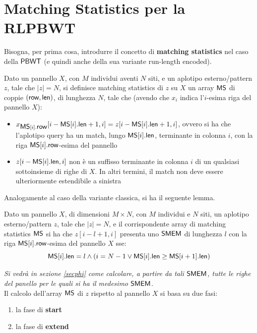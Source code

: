 \section{Matching Statistics per la RLPBWT}
Bisogna, per prima cosa, introdurre il 
concetto di \textbf{matching statistics} nel caso della $\mbox{\rm {\sf PBWT}}$ (e quindi
anche della sua variante run-length encoded).
\begin{definizione}
  Dato un pannello $X$, con $M$ individui aventi $N$ siti,
  e un aplotipo esterno/pattern $z$, tale che $|z|=N$, si definisce matching
  statistics di $z$ su $X$ un array $\mbox{\rm {\sf MS}}$ di coppie $(\mbox{\rm {\sf row}},\mbox{\rm {\sf len}})$, di lunghezza
  $N$, tale che (avendo che $x_i$ indica l'$i$-esima riga del pannello $X$): 
  \begin{itemize}
    \item $x_{\mbox{\rm {\sf MS}}[i].\mbox{\rm {\sf row}}}[i-\mbox{\rm {\sf MS}}[i].\mbox{\rm {\sf len}}+1,i]=z[i-\mbox{\rm {\sf MS}}[i].\mbox{\rm {\sf len}}+1,i]$, ovvero si
    ha che 
    l'aplotipo query ha un match, lungo $\mbox{\rm {\sf MS}}[i].\mbox{\rm {\sf len}}$, terminante in colonna
    $i$, con la riga 
    $\mbox{\rm {\sf MS}}[i].\mbox{\rm {\sf row}}$-esima del pannello
    \item $z[i-\mbox{\rm {\sf MS}}[i].\mbox{\rm {\sf len}},i]$ non è un suffisso terminante in colonna $i$ di un
    qualsiasi sottoinsieme di righe di $X$. In altri termini, il match non deve
    essere ulteriormente estendibile a sinistra
  \end{itemize}
\end{definizione}
\noindent
Analogamente al caso della variante classica, si ha il seguente lemma.
\begin{lemma}
  Dato un pannello $X$, di dimensioni $M\times N$, con $M$ individui e $N$
  siti, un aplotipo esterno/pattern $z$, tale che $|z|=N$, e il corrispondente
  array di matching statistics $\mbox{\rm {\sf MS}}$ si ha che $z[i-l+1,i]$
  presenta uno $\mbox{\rm {\sf SMEM}}$ di lunghezza $l$ con la riga $\mbox{\rm {\sf MS}}[i].\mbox{\rm {\sf row}}$-esima del
  pannello $X$ sse: 
  \begin{equation}
    \label{eq:rlpbwtsmem}
    \mbox{\rm {\sf MS}}[i].\mbox{\rm {\sf len}}=l\land(i=N-1\lor \mbox{\rm {\sf MS}}[i].\mbox{\rm {\sf len}}\geq \mbox{\rm {\sf MS}}[i+1].\mbox{\rm {\sf len}})
  \end{equation}
\end{lemma}
\noindent
\textit{Si vedrà in sezione \ref{secphi} come calcolare, a partire da tali
  $\mbox{\rm {\sf SMEM}}$, tutte le righe del panello per le quali si ha il medesimo
  $\mbox{\rm {\sf SMEM}}$}.\\
Il calcolo dell'array $\mbox{\rm {\sf MS}}$ di $z$ rispetto al pannello $X$ si basa su due fasi:
\begin{enumerate}
  \item la fase di \textbf{start}
  \item la fase di \textbf{extend}
\end{enumerate}
